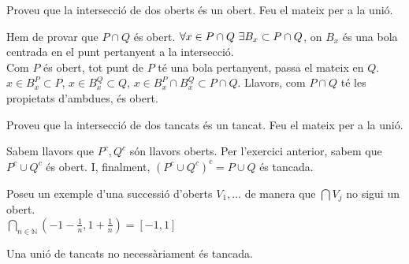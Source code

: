 \documentclass[../main.tex]{subfiles}
\begin{document}
    \begin{exercici}[5 de la llista 1]
        Proveu que la intersecció de dos oberts és un obert. Feu el mateix per a la unió.
        \begin{center}
        \end{center}
        Hem de provar que $P\cap Q$ és obert. $\forall x \in P\cap Q \hbox{ }\exists B_x \subset P\cap Q$,
        on $B_x$ és una bola centrada en el punt pertanyent a la intersecció.\\
        Com $P$ és obert, tot punt de $P$ té una bola pertanyent, passa el mateix en $Q$.\\
        $x \in B_x^P \subset P$, $x \in B_x^Q \subset Q$, $x \in B_x^P \cap B_x^Q \subset P\cap Q$.
        Llavors, com $P\cap Q$ té les propietats d'ambdues, és obert.
    \end{exercici}
    \begin{exercici}[6 de la llista 1]
        Proveu que la intersecció de dos tancats és un tancat. Feu el mateix per a la unió.
        \begin{center}
        \end{center}
        Sabem llavors que $P^c, Q^c$ són llavors oberts. Per l'exercici anterior, sabem que $P^c\cup Q^c$
        és obert. I, finalment, $\left(P^c\cup Q^c\right)^c = P\cup Q$ és tancada. 
    \end{exercici}
    \begin{exercici}[7 de la llista 1] Poseu un exemple d'una successió d'oberts $V_1, \dots$ de manera que $\bigcap V_j$ no sigui un obert.\\
        $\bigcap\limits_{n \in \mathbb{N}} \left(-1-\frac{1}{n}, 1+\frac{1}{n}\right) = [-1, 1]$
        \begin{obs}
            Una unió de tancats no necessàriament és tancada.
        \end{obs}
    \end{exercici}
\end{document}
